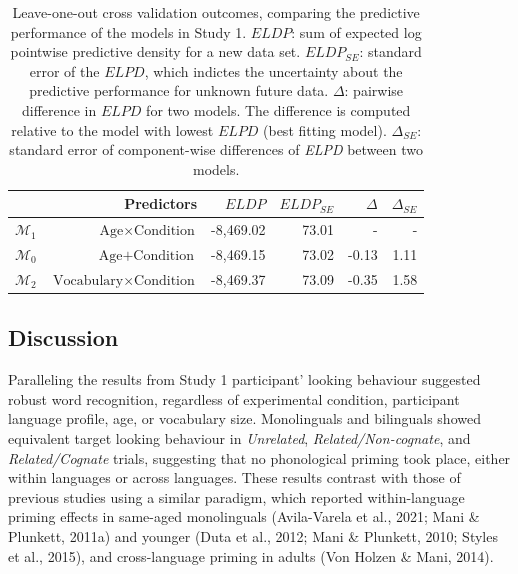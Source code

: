 \documentclass[
  12pt,
  b5paperpaper,
  twoside]{scrreprt}
\begin{document}
\hypertarget{tbl-loos-bcn}{}
\begin{table}
\caption{\label{tbl-loos-bcn}Leave-one-out cross validation outcomes, comparing the predictive
performance of the models in Study 1. \(ELDP\): sum of expected log
pointwise predictive density for a new data set. \(ELDP_{SE}\): standard
error of the \(ELPD\), which indictes the uncertainty about the
predictive performance for unknown future data. \(\Delta\): pairwise
difference in \(ELPD\) for two models. The difference is computed
relative to the model with lowest \(ELPD\) (best fitting model).
\(\Delta_{SE}\): standard error of component-wise differences of
\emph{ELPD} between two models. }\tabularnewline

\centering
\begin{tabular}{lrrrrr}
\toprule
  & Predictors & $ELDP$ & $ELDP_{SE}$ & $\Delta$ & $\Delta_{SE}$\\
\midrule
$\mathcal{M}_1$ & $\text{Age} \times \text{Condition}$ & -8,469.02 & 73.01 & - & -\\
$\mathcal{M}_0$ & $\text{Age} + \text{Condition}$ & -8,469.15 & 73.02 & -0.13 & 1.11\\
$\mathcal{M}_2$ & $\text{Vocabulary} \times \text{Condition}$ & -8,469.37 & 73.09 & -0.35 & 1.58\\
\bottomrule
\end{tabular}
\end{table}

\hypertarget{discussion-1}{%
\subsection{Discussion}\label{discussion-1}}

Paralleling the results from Study 1 participant' looking behaviour
suggested robust word recognition, regardless of experimental condition,
participant language profile, age, or vocabulary size. Monolinguals and
bilinguals showed equivalent target looking behaviour in
\emph{Unrelated}, \emph{Related/Non-cognate}, and \emph{Related/Cognate}
trials, suggesting that no phonological priming took place, either
within languages or across languages. These results contrast with those
of previous studies using a similar paradigm, which reported
within-language priming effects in same-aged monolinguals (Avila-Varela
et al., 2021; Mani \& Plunkett, 2011a) and younger (Duta et al., 2012;
Mani \& Plunkett, 2010; Styles et al., 2015), and cross-language priming
in adults (Von Holzen \& Mani, 2014).
\end{document}
